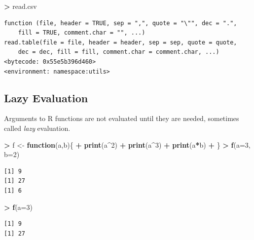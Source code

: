 \documentclass[]{krantz}
\makeatletter
\newenvironment{Shaded}{\begin{snugshade}}{\end{snugshade}}
\newcommand{\KeywordTok}[1]{\textcolor[rgb]{0.27,0.27,0.27}{\textbf{#1}}}
\newcommand{\DataTypeTok}[1]{\textcolor[rgb]{0.27,0.27,0.27}{#1}}
\newcommand{\DecValTok}[1]{\textcolor[rgb]{0.06,0.06,0.06}{#1}}
\newcommand{\StringTok}[1]{\textcolor[rgb]{0.5,0.5,0.5}{#1}}
\newcommand{\ControlFlowTok}[1]{\textcolor[rgb]{0.27,0.27,0.27}{\textbf{#1}}}
\newcommand{\OperatorTok}[1]{\textcolor[rgb]{0.43,0.43,0.43}{\textbf{#1}}}
\newcommand{\NormalTok}[1]{#1}
\newenvironment{kframe}{%
\medskip{}
\setlength{\fboxsep}{.8em}
 \def\at@end@of@kframe{}%
 \ifinner\ifhmode%
  \def\at@end@of@kframe{\end{minipage}}%
  \begin{minipage}{\columnwidth}%
 \fi\fi%
 \def\FrameCommand##1{\hskip\@totalleftmargin \hskip-\fboxsep
 \colorbox{shadecolor}{##1}\hskip-\fboxsep
     \hskip-\linewidth \hskip-\@totalleftmargin \hskip\columnwidth}%
 \MakeFramed {\advance\hsize-\width
   \@totalleftmargin\z@ \linewidth\hsize
   \@setminipage}}%
 {\par\unskip\endMakeFramed%
 \at@end@of@kframe}
\renewenvironment{Shaded}{\begin{kframe}}{\end{kframe}}
\makeatother
\begin{document}
\begin{Shaded}
\begin{Highlighting}[]
\OperatorTok{>}\StringTok{ }\NormalTok{read.csv}
\end{Highlighting}
\end{Shaded}

\begin{verbatim}
function (file, header = TRUE, sep = ",", quote = "\"", dec = ".", 
    fill = TRUE, comment.char = "", ...) 
read.table(file = file, header = header, sep = sep, quote = quote, 
    dec = dec, fill = fill, comment.char = comment.char, ...)
<bytecode: 0x55e5b396d460>
<environment: namespace:utils>
\end{verbatim}

\subsection{Lazy Evaluation}\label{lazy-evaluation}

Arguments to R functions are not evaluated until they are needed,
sometimes called \emph{lazy} evaluation.

\begin{Shaded}
\begin{Highlighting}[]
\OperatorTok{>}\StringTok{ }\NormalTok{f <-}\StringTok{ }\ControlFlowTok{function}\NormalTok{(a,b)\{}
\OperatorTok{+}\StringTok{     }\KeywordTok{print}\NormalTok{(a}\OperatorTok{^}\DecValTok{2}\NormalTok{)}
\OperatorTok{+}\StringTok{     }\KeywordTok{print}\NormalTok{(a}\OperatorTok{^}\DecValTok{3}\NormalTok{)}
\OperatorTok{+}\StringTok{     }\KeywordTok{print}\NormalTok{(a}\OperatorTok{*}\NormalTok{b)}
\OperatorTok{+}\StringTok{ }\NormalTok{\}}
\OperatorTok{>}\StringTok{ }\KeywordTok{f}\NormalTok{(}\DataTypeTok{a=}\DecValTok{3}\NormalTok{, }\DataTypeTok{b=}\DecValTok{2}\NormalTok{)}
\end{Highlighting}
\end{Shaded}

\begin{verbatim}
[1] 9
[1] 27
[1] 6
\end{verbatim}

\begin{Shaded}
\begin{Highlighting}[]
\OperatorTok{>}\StringTok{ }\KeywordTok{f}\NormalTok{(}\DataTypeTok{a=}\DecValTok{3}\NormalTok{)}
\end{Highlighting}
\end{Shaded}

\begin{verbatim}
[1] 9
[1] 27
\end{verbatim}
\end{document}
